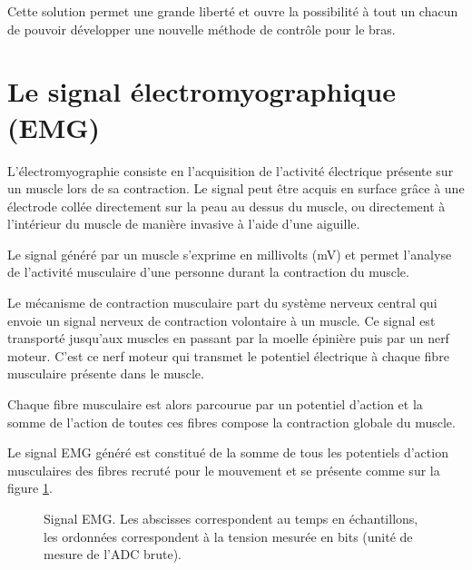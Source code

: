 \documentclass[letterpaper, twoside, 12pt, memoire, creativecommons, hyperref]{thETS}
\begin{document}
Cette solution permet une grande liberté et ouvre la possibilité à tout un chacun de pouvoir développer une nouvelle méthode de contrôle pour le bras.

\section{Le signal électromyographique (EMG)}

L'électromyographie consiste en l'acquisition de l'activité électrique présente sur un muscle lors de sa contraction. Le signal peut être acquis en surface grâce à une électrode collée directement sur la peau au dessus du muscle, ou directement à l'intérieur du muscle de manière invasive à l'aide d'une aiguille.

Le signal généré par un muscle s'exprime en millivolts (mV) et permet l'analyse de l'activité musculaire d'une personne durant la contraction du muscle.

Le mécanisme de contraction musculaire part du système nerveux central qui envoie un signal nerveux de contraction volontaire à un muscle. Ce signal est transporté jusqu'aux muscles en passant par la moelle épinière puis par un nerf moteur. C'est ce nerf moteur qui transmet le potentiel électrique à chaque fibre musculaire présente dans le muscle. 

Chaque fibre musculaire est alors parcourue par un potentiel d'action et la somme de l'action de toutes ces fibres compose la contraction globale du muscle.

Le signal EMG généré est constitué de la somme de tous les potentiels d'action musculaires des fibres recruté pour le mouvement et se présente comme sur la figure \ref{fig:emg}.

\begin{figure}
	\centering
	\caption{Signal EMG. Les abscisses correspondent au temps en échantillons, les ordonnées correspondent à la tension mesurée en bits (unité de mesure de l'ADC brute).}
	\label{fig:emg}
\end{figure}
\end{document}

